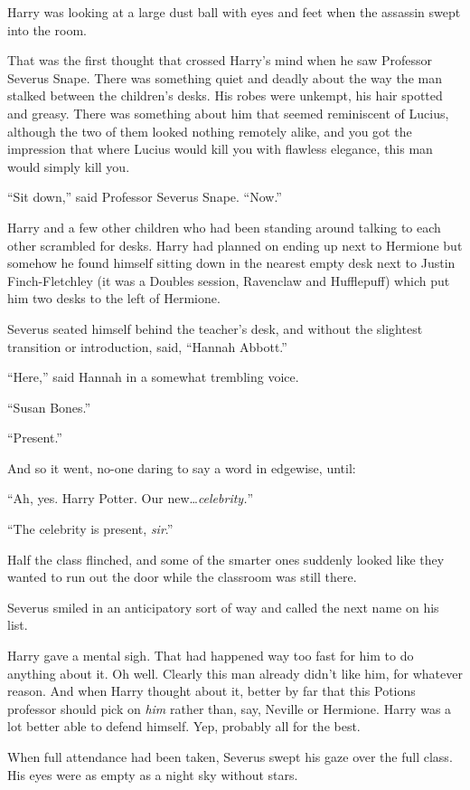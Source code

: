 Harry was looking at a large dust ball with eyes and feet when the assassin swept into the room.

That was the first thought that crossed Harry’s mind when he saw Professor Severus Snape. There was something quiet and deadly about the way the man stalked between the children’s desks. His robes were unkempt, his hair spotted and greasy. There was something about him that seemed reminiscent of Lucius, although the two of them looked nothing remotely alike, and you got the impression that where Lucius would kill you with flawless elegance, this man would simply kill you.

“Sit down,” said Professor Severus Snape. “Now.”

Harry and a few other children who had been standing around talking to each other scrambled for desks. Harry had planned on ending up next to Hermione but somehow he found himself sitting down in the nearest empty desk next to Justin Finch-Fletchley (it was a Doubles session, Ravenclaw and Hufflepuff) which put him two desks to the left of Hermione.

Severus seated himself behind the teacher’s desk, and without the slightest transition or introduction, said, “Hannah Abbott.”

“Here,” said Hannah in a somewhat trembling voice.

“Susan Bones.”

“Present.”

And so it went, no-one daring to say a word in edgewise, until:

“Ah, yes. Harry Potter. Our new…\emph{celebrity.}”

“The celebrity is present, \emph{sir}.”

Half the class flinched, and some of the smarter ones suddenly looked like they wanted to run out the door while the classroom was still there.

Severus smiled in an anticipatory sort of way and called the next name on his list.

Harry gave a mental sigh. That had happened way too fast for him to do anything about it. Oh well. Clearly this man already didn’t like him, for whatever reason. And when Harry thought about it, better by far that this Potions professor should pick on \emph{him} rather than, say, Neville or Hermione. Harry was a lot better able to defend himself. Yep, probably all for the best.

When full attendance had been taken, Severus swept his gaze over the full class. His eyes were as empty as a night sky without stars.

